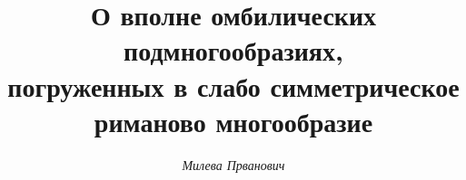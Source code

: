 













\newcommand{\up}[2]{\overset{#1}{#2}{}}


\newcommand{\const}{\operatorname{const}}


\newcommand{\tts}[1]{}










\setcounter{page}{54}












\author{\it Милева Прванович}




\title{О вполне омбилических подмногообразиях,\\


погруженных в слабо симметрическое\\


риманово многообразие}





\date{}







\pagestyle{plain} %








